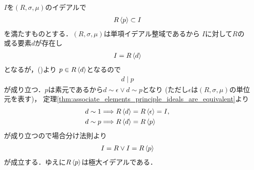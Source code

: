 	\begin{prf}
		$I$を$(R,\sigma,\mu)$のイデアルで
		\begin{align}
			R\inprod<p> \subset I
			\label{eq:thm_principal_ideal_domain_maximum_ideal_1}
		\end{align}
		を満たすものとする．$(R,\sigma,\mu)$は単項イデアル整域であるから
		$I$に対して$R$の或る要素$d$が存在し
		\begin{align}
			I = R\inprod<d>
		\end{align}
		となるが，()より
		$p \in R\inprod<d>$となるので
		\begin{align}
			d \mid p
		\end{align}
		が成り立つ．$p$は素元であるから$d \sim \epsilon \vee d \sim p$となり
		(ただし$\epsilon$は$(R,\sigma,\mu)$の単位元を表す)，
		定理\ref{thm:associate_elements_principle_ideals_are_equivalent}より
		\begin{align}
			&d \sim 1 \Longrightarrow R\inprod<d> = R\inprod<\epsilon> = I, \\
			&d \sim p \Longrightarrow R\inprod<d> = R\inprod<p>
		\end{align}
		が成り立つので場合分け法則より
		\begin{align}
			I = R \vee I = R\inprod<p>
		\end{align}
		が成立する．ゆえに$R\inprod<p>$は極大イデアルである．
		\QED
	\end{prf}